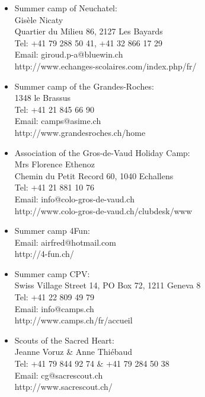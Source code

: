 \begin{itemize}
\vspace{4pt}
\item Summer camp of Neuchatel:\\
Gisèle Nicaty \\
Quartier du Milieu 86, 2127 Les Bayards \\
Tel: +41 79 288 50 41, +41 32 866 17 29\\
Email: giroud.p-a@bluewin.ch\\
http://www.echanges-scolaires.com/index.php/fr/

\vspace{4pt}
\item Summer camp of the Grandes-Roches: \\
1348 le Brassus \\
Tel: +41 21 845 66 90 \\
Email: camps@asime.ch \\
http://www.grandesroches.ch/home 

\vspace{4pt}
\item Association of the Gros-de-Vaud Holiday Camp: \\
Mrs Florence Ethenoz \\
Chemin du Petit Record 60, 1040 Echallens \\
Tel: +41 21 881 10 76 \\
Email: info@colo-gros-de-vaud.ch \\
http://www.colo-gros-de-vaud.ch/clubdesk/www

\vspace{4pt}
\item Summer camp 4Fun: \\
Email: airfred@hotmail.com \\
http://4-fun.ch/ 

\vspace{4pt}
\item Summer camp CPV: \\
Swiss Village Street 14, PO Box 72, 1211 Geneva 8 \\
Tel: +41 22 809 49 79 \\
Email: info@camps.ch \\
http://www.camps.ch/fr/accueil 

\vspace{4pt}
\item Scouts of the Sacred Heart: \\
Jeanne Voruz \& Anne Thiébaud \\
Tel: +41 79 844 92 74 \& +41 79 284 50 38 \\
Email: cg@sacrescout.ch \\
http://www.sacrescout.ch/ 


\end{itemize}
